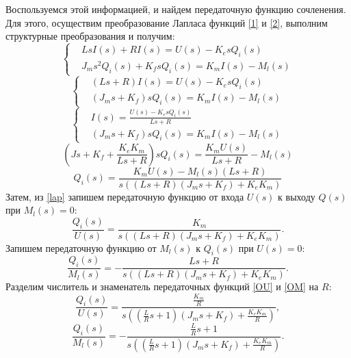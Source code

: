 Воспользуемся этой информацией, и найдем передаточную функцию сочленения. Для этого, осуществим преобразование Лапласа функций \eqref{1} и \eqref{2}, выполним структурные преобразования и получим:
\begin{equation}
	\left\{	
		\begin{aligned}
			&LsI(s)+RI(s)=U(s)-K_esQ_i(s)\\
			&J_ms^2Q_i(s) + K_fsQ_i(s) = K_mI(s) - M_l(s)
		\end{aligned}
	\right.
\end{equation}
\begin{equation}
	\left\{	
		\begin{aligned}
			&(Ls+R)I(s)=U(s)-K_esQ_i(s)\\
			&(J_ms + K_f)sQ_i(s) = K_mI(s) - M_l(s)
		\end{aligned}
	\right.
\end{equation}
\begin{equation}
	\left\{	
		\begin{aligned}
			&I(s)=\frac{U(s)-K_esQ_i(s)}{Ls+R}\\
			&(J_ms + K_f)sQ_i(s) = K_mI(s) - M_l(s)
		\end{aligned}
	\right.
\end{equation}
\begin{equation}
	(Js+K_f+\frac{K_eK_m}{Ls+R})sQ_i(s)=\frac{K_mU(s)}{Ls+R}-M_l(s)
\end{equation}
\begin{equation}\label{lap}
	Q_i(s) = \frac{K_mU(s)-M_l(s)(Ls+R)}{s((Ls+R)(J_ms+K_f)+K_eK_m)}
\end{equation}
Затем, из \eqref{lap} запишем передаточную функцию от входа $U(s)$ к выходу $Q(s)$ при $M_l(s) = 0$:
\begin{equation}\label{OU}
	\frac{Q_i(s)}{U(s)}=\frac{K_m}{s((Ls+R)(J_ms+K_f)+K_eK_m)}.
\end{equation}
Запишем передаточную функцию от $M_l(s)$ к $Q_i(s)$ при $U(s) = 0$: 
\begin{equation}\label{OM}
	\frac{Q_i(s)}{M_l(s)}=-\frac{Ls+R}{s((Ls+R)(J_ms+K_f)+K_eK_m)}.
\end{equation}
Разделим числитель и знаменатель передаточных функций \eqref{OU} и \eqref{OM} на $R$:
\begin{equation}\label{OUR}
	\frac{Q_i(s)}{U(s)}=\frac{\frac{K_m}{R}}{s((\frac{L}{R}s+1)(J_ms+K_f)+\frac{K_eK_m}{R})},
\end{equation}
\begin{equation}\label{OMR}
	\frac{Q_i(s)}{M_l(s)}=-\frac{\frac{L}{R}s+1}{s((\frac{L}{R}s+1)(J_ms+K_f)+\frac{K_eK_m}{R})}.
\end{equation}
